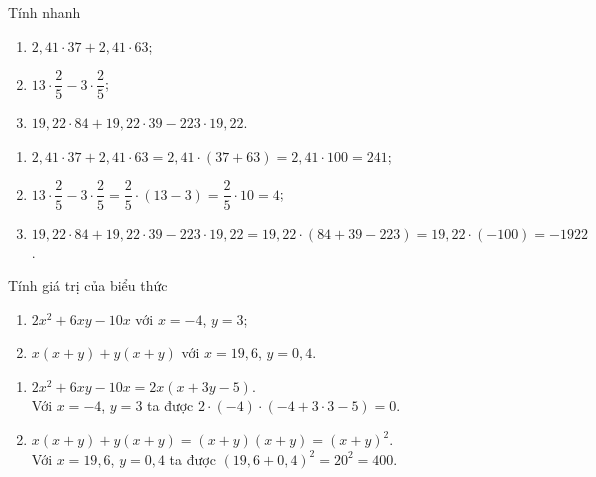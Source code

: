 \begin{vd}
	Tính nhanh
	\begin{enumerate}
		\item  $2,41 \cdot 37 + 2,41 \cdot 63$;
		\item $13 \cdot \dfrac{2}{5} - 3 \cdot \dfrac{2}{5}$;
		\item $19,22 \cdot 84 + 19,22 \cdot39 -223\cdot19,22$.
	\end{enumerate}
	\loigiai
	{
		\begin{enumerate}
				\item  $2,41 \cdot 37 + 2,41 \cdot 63 =2,41\cdot (37+63)=2,41 \cdot100=241$;
			\item $13 \cdot \dfrac{2}{5} - 3 \cdot \dfrac{2}{5} =\dfrac{2}{5} \cdot (13-3)= \dfrac{2}{5} \cdot10=4$;
			\item $19,22 \cdot 84 + 19,22 \cdot39 -223\cdot19,22 = 19,22\cdot(84+39-223)=19,22 \cdot(-100)=-1922$.
		\end{enumerate}	
	}
\end{vd}

\begin{vd}
	Tính giá trị của biểu thức
	\begin{enumerate}
		\item $2x^2+6xy-10x$ với $x=-4$, $y=3$;
		\item $x(x+y)+y(x+y)$ với $x=19,6$, $y=0,4$. 
\end{enumerate}
	\loigiai
	{
		\begin{enumerate}
			\item $2x^2+6xy-10x = 2x(x+3y-5)$.\\
			Với $x=-4$, $y=3$ ta được $2 \cdot(-4)\cdot (-4+3\cdot3-5)=0$.
			\item $x(x+y)+y(x+y) =(x+y)(x+y)=(x+y)^2$.\\
			Với $x=19,6$, $y=0,4$ ta được $(19,6+0,4)^2 = 20^2 =400$.
		\end{enumerate}	
	}
\end{vd}

